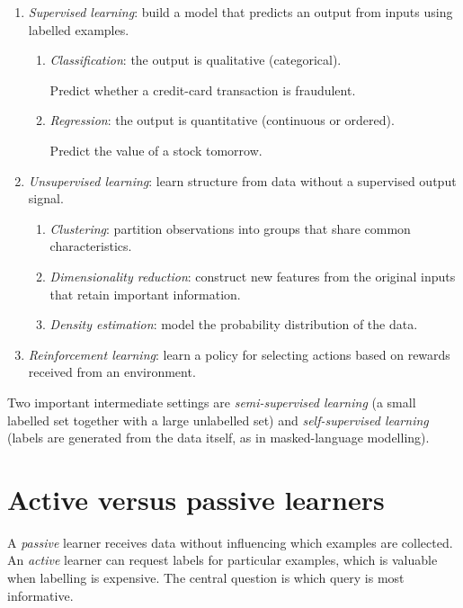 \documentclass[a4paper, 12pt]{book}
\begin{document}
\begin{enumerate}
    \item \emph{Supervised learning}: build a model that predicts an output from
    inputs using labelled examples.
    \begin{enumerate}
        \item \emph{Classification}: the output is qualitative (categorical).
        \begin{example}
            Predict whether a credit-card transaction is fraudulent.
        \end{example}
        \item \emph{Regression}: the output is quantitative (continuous or ordered).
        \begin{example}
            Predict the value of a stock tomorrow.
        \end{example}
    \end{enumerate}
    \item \emph{Unsupervised learning}: learn structure from data without a supervised
    output signal.
    \begin{enumerate}
        \item \emph{Clustering}: partition observations into groups that share common
        characteristics.
        \item \emph{Dimensionality reduction}: construct new features from the original
        inputs that retain important information.
        \item \emph{Density estimation}: model the probability distribution of the data.
    \end{enumerate}
    \item \emph{Reinforcement learning}: learn a policy for selecting actions based on
    rewards received from an environment.
\end{enumerate}

Two important intermediate settings are \emph{semi-supervised learning} (a small
labelled set together with a large unlabelled set) and \emph{self-supervised learning}
(labels are generated from the data itself, as in masked-language modelling).

\section{Active versus passive learners}

A \emph{passive} learner receives data without influencing which examples are
collected. An \emph{active} learner can request labels for particular examples, which
is valuable when labelling is expensive. The central question is which query is most
informative.
\end{document}

